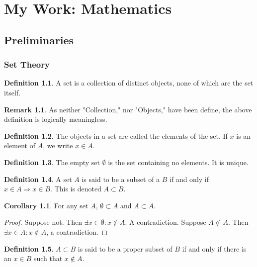 \documentclass[oneside]{book}
\theoremstyle{definition}
\newtheorem{definition}{Definition}[section]
\newtheorem{corollary}{Corollary}[section]
\newtheorem{remark}{Remark}[section]
\begin{document}
\part{My Work: Mathematics}

\chapter{Preliminaries}

\section{Set Theory}

\begin{definition}
A set is a collection of distinct objects, none of which are the set itself.
\end{definition}

\begin{remark}
As neither "Collection," nor "Objects," have been define, the above definition is logically meaningless.
\end{remark}

\begin{definition}
The objects in a set are called the elements of the set. If $x$ is an element of $A$, we write $x\in A$.
\end{definition}

\begin{definition}
The empty set $\emptyset$ is the set containing no elements. It is unique.
\end{definition}

\begin{definition}
A set $A$ is said to be a subset of a $B$ if and only if $x\in A\Rightarrow x\in B$. This is denoted $A\subset B$.
\end{definition}

\begin{corollary}
For any set $A$, $\emptyset \subset A$ and $A\subset A$.
\end{corollary}
\begin{proof}
Suppose not. Then $\exists x\in \emptyset: x\notin A$. A contradiction. Suppose $A\not\subset A$. Then $\exists x\in A:x\notin A$, a contradiction.
\end{proof}

\begin{definition}
$A\subset B$ is said to be a proper subset of $B$ if and only if there is an $x\in B$ such that $x\notin A$.
\end{definition}
\end{document}
